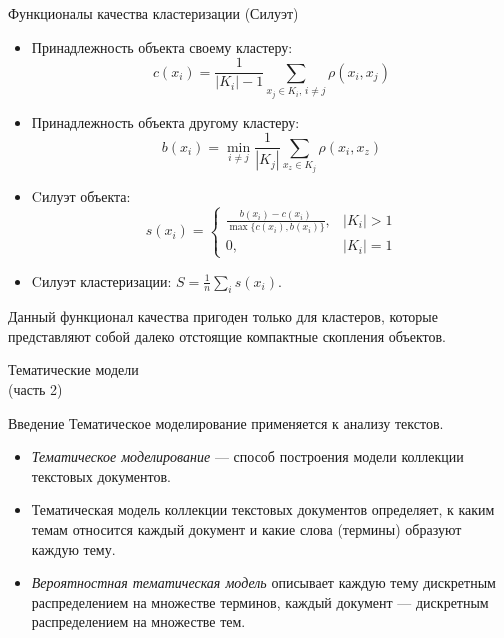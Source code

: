 \documentclass{beamer}
\begin{document}
\begin{frame}{Функционалы качества кластеризации (Силуэт)}
\begin{itemize}
    \item  Принадлежность объекта своему кластеру:
   \begin{equation*}
    c(x_i) = \frac{1}{|K_i| - 1}\sum\limits_{x_j \in K_i,\, i\neq j}\rho(x_i, x_j)
    \end{equation*}
    \item Принадлежность объекта другому кластеру:
    \begin{equation*}
    b(x_i) = \min\limits_{i\neq j}\frac{1}{|K_j|}\sum\limits_{x_z \in K_j}\rho(x_i, x_z)
    \end{equation*}
    \item  Cилуэт объекта:
    \begin{equation*}
    s(x_i) =
    \begin{cases}
    \frac{b(x_i) - c(x_i)}{\max\{c(x_i), b(x_i)\}}, & |K_i| > 1\\
    0, & |K_i| = 1
    \end{cases}
    \end{equation*}
    \item Cилуэт кластеризации: $S =\frac{1}{n}\sum\limits_{i}s(x_i)$.
\end{itemize}
\vspace{3\ex}
Данный функционал качества пригоден только для кластеров, которые представляют собой далеко отстоящие компактные скопления объектов.
\end{frame}

\begin{frame}{}
   \begin{center}
       \LARGE{Тематические модели}\\
       \vspace{2ex}
       \normalsize{(часть 2)}
   \end{center}
\end{frame}

\begin{frame}{Введение}
   Тематическое моделирование применяется к анализу текстов.
   
   \begin{itemize}
       \item \textit{Тематическое моделирование} --- способ построения модели коллекции текстовых документов. 
       \item Тематическая модель коллекции текстовых документов определяет, к каким темам относится каждый документ и какие слова (термины) образуют каждую тему.
       \item \textit{Вероятностная тематическая модель} описывает каждую тему дискретным распределением на множестве терминов, каждый документ --- дискретным распределением на множестве тем.
   \end{itemize}
\end{frame}
\end{document}
